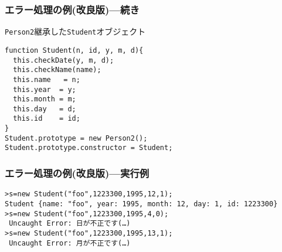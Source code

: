 \documentclass[dvipsk]{beamer}
\begin{document}
\begin{frame}[containsverbatim]
 \frametitle{エラー処理の例(改良版)---続き}
\texttt{Person2}継承した\texttt{Student}オブジェクト
\begin{verbatim}
function Student(n, id, y, m, d){
  this.checkDate(y, m, d);
  this.checkName(name);
  this.name   = n;
  this.year  = y;
  this.month = m;
  this.day   = d;
  this.id    = id;
}
Student.prototype = new Person2();
Student.prototype.constructor = Student;
\end{verbatim}
\end{frame}
\begin{frame}[containsverbatim]
 \frametitle{エラー処理の例(改良版)---実行例}
\begin{verbatim}
>s=new Student("foo",1223300,1995,12,1);
Student {name: "foo", year: 1995, month: 12, day: 1, id: 1223300}
>s=new Student("foo",1223300,1995,4,0);
 Uncaught Error: 日が不正です(…)
>s=new Student("foo",1223300,1995,13,1);
 Uncaught Error: 月が不正です(…)
\end{verbatim}
\end{frame}
\end{document}

